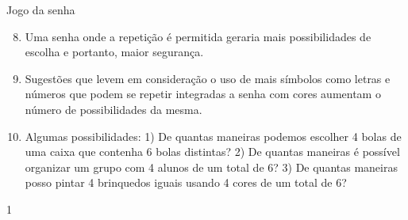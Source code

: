 \clearmargin
\begin{answer}{Jogo da senha}
{
\begin{enumerate}\setcounter{enumi}{7}
\item Uma senha onde a repetição é permitida geraria mais possibilidades de escolha e portanto, maior segurança.

\item Sugestões que levem em consideração o uso de mais símbolos como letras e números que podem se repetir integradas a senha com cores  aumentam o número de possibilidades da mesma.

\item Algumas possibilidades: 1) De quantas maneiras podemos escolher 4 bolas de uma caixa que contenha 6 bolas distintas? 2) De quantas maneiras é possível organizar um grupo com 4 alunos de um total de 6? 3) De quantas maneiras posso pintar 4 brinquedos iguais usando 4 cores de um total de 6?
\end{enumerate}
}{1}
\end{answer}


